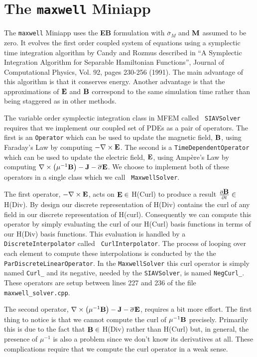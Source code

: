 \documentclass[12pt]{article}
\providecommand{\B}{\mbox{\bf B}}
\providecommand{\E}{\mbox{\bf E}}
\providecommand{\J}{\mbox{\bf J}}
\providecommand{\M}{\mbox{\bf M}}
\providecommand{\sE}{\overline{\sigma}}
\providecommand{\sM}{\overline{\sigma}_M}
\newcommand{\Curl}{\nabla\times}
\begin{document}
\section{The {\tt maxwell} Miniapp}

The {\tt maxwell} Miniapp uses the {\bf EB} formulation with $\sM$ and
$\M$ assumed to be zero. It evolves the first order coupled system of
equations using a symplectic time integration algorithm by Candy and
Rozmus described in ``A Symplectic Integration Algorithm for Separable
Hamiltonian Functions'', Journal of Computational Physics, Vol. 92,
pages 230-256 (1991). The main advantage of this algorithm is that it
conserves energy. Another advantage is that the approximations of $\E$
and $\B$ correspond to the same simulation time rather than being
staggered as in other methods.

The variable order symplectic integration class in MFEM called {\tt
  SIAVSolver} requires that we implement our coupled set of PDEs as a
pair of operators. The first is an {\tt Operator} which can be used to
update the magnetic field, $\B$, using Faraday's Law by computing
$-\Curl\E$. The second is a {\tt TimeDependentOperator} which can be
used to update the electric field, $\E$, using Amp\`ere's Law by
computing $\Curl\left(\mu^{-1}\B\right)-\J-\sE\E$. We choose to
implement both of these operators in a single class which we call {\tt
  MaxwellSolver}.

The first operator, $-\Curl\E$, acts on $\E\in$ H(Curl) to produce a
result $\frac{\partial\B}{\partial t}\in$ H(Div). By design our
discrete representation of H(Div) contains the curl of any field in
our discrete representation of H(curl).  Consequently we can compute
this operator by simply evaluating the curl of our H(Curl) basis
functions in terms of our H(Div) basis functions. This evaluation is
handled by a {\tt DiscreteInterpolator} called {\tt
  CurlInterpolator}. The process of looping over each element to
compute these interpolations is conducted by the the {\tt
  ParDiscreteLinearOperator}. In the {\tt MaxwellSolver} this curl
operator is simply named {\tt Curl\_} and its negative, needed by the
{\tt SIAVSolver}, is named {\tt NegCurl\_}. These operators are setup
between lines 227 and 236 of the file {\tt maxwell\_solver.cpp}.

The second operator, $\Curl\left(\mu^{-1}\B\right)-\J-\sE\E$, requires
a bit more effort. The first thing to notice is that we cannot compute
the curl of $\mu^{-1}\B$ precisely. Primarily this is due to the fact
that $\B\in$ H(Div) rather than H(Curl) but, in general, the presence
of $\mu^{-1}$ is also a problem since we don't know its derivatives at
all. These complications require that we compute the curl operator in
a weak sense.
\end{document}
